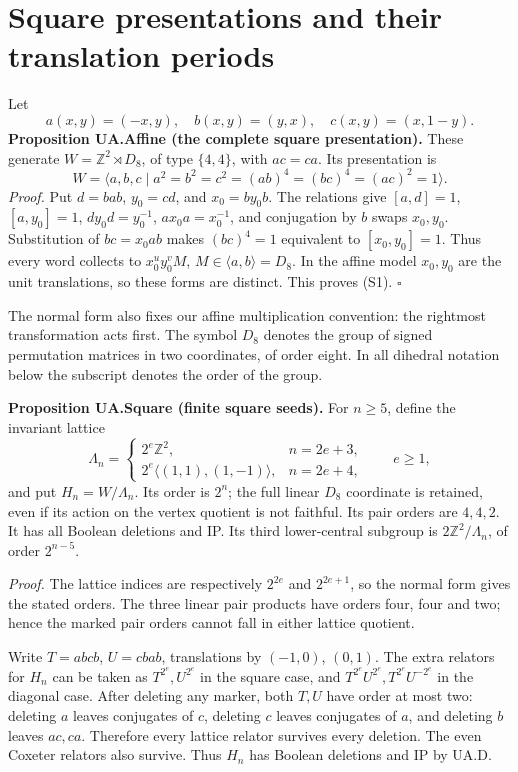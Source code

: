\section{Square presentations and their translation periods}\label{square-presentations-and-their-translation-periods}

Let
\[
 a(x,y)=(-x,y),\quad b(x,y)=(y,x),\quad c(x,y)=(x,1-y).
\]
\textbf{Proposition UA.Affine (the complete square presentation).} These generate \(W=\mathbb Z^2\rtimes D_8\), of type \(\{4,4\}\), with
\(ac=ca\). Its presentation is
\[
 W=\langle a,b,c\mid a^2=b^2=c^2=(ab)^4=(bc)^4=(ac)^2=1\rangle. \tag{S1}
\]
\emph{Proof.} Put \(d=bab\), \(y_0=cd\), and
\(x_0=by_0b\). The relations give \([a,d]=1\), \([a,y_0]=1\),
\(dy_0d=y_0^{-1}\), \(ax_0a=x_0^{-1}\), and conjugation by \(b\) swaps
\(x_0,y_0\). Substitution of \(bc=x_0ab\) makes \((bc)^4=1\) equivalent
to \([x_0,y_0]=1\). Thus every word collects to \(x_0^u y_0^v M\),
\(M\in\langle a,b\rangle=D_8\). In the affine model \(x_0,y_0\) are the
unit translations, so these forms are distinct. This proves (S1). \(\square\)

The normal form also fixes our affine multiplication convention: the rightmost transformation acts first. The symbol \(D_8\) denotes the group of signed permutation matrices in two coordinates, of order eight. In all dihedral notation below the subscript denotes the order of the group.

\textbf{Proposition UA.Square (finite square seeds).} For \(n\ge5\), define the invariant lattice
\[
 \Lambda_n=\begin{cases}
  2^e\mathbb Z^2,&n=2e+3,\\
  2^e\langle(1,1),(1,-1)\rangle,&n=2e+4,
 \end{cases}\qquad e\ge1,
\]
and put \(H_n=W/\Lambda_n\). Its order is \(2^n\); the full linear
\(D_8\) coordinate is retained, even if its action on the vertex quotient
is not faithful. Its pair orders are \(4,4,2\). It has all Boolean deletions and IP. Its third lower-central subgroup is \(2\mathbb Z^2/\Lambda_n\), of order \(2^{n-5}\).

\emph{Proof.} The lattice indices are respectively \(2^{2e}\) and \(2^{2e+1}\), so the normal form gives the stated orders. The three linear pair products have orders four, four and two; hence the marked pair orders cannot fall in either lattice quotient.

Write \(T=abcb\), \(U=cbab\), translations by \((-1,0)\), \((0,1)\).
The extra relators for \(H_n\) can be taken as \(T^{2^e},U^{2^e}\) in
the square case, and \(T^{2^e}U^{2^e},T^{2^e}U^{-2^e}\) in the diagonal
case. After deleting any marker, both \(T,U\) have order at most two:
deleting \(a\) leaves conjugates of \(c\), deleting \(c\) leaves
conjugates of \(a\), and deleting \(b\) leaves \(ac,ca\). Therefore
every lattice relator survives every deletion. The even Coxeter relators
also survive. Thus \(H_n\) has Boolean deletions and IP by UA.D.

